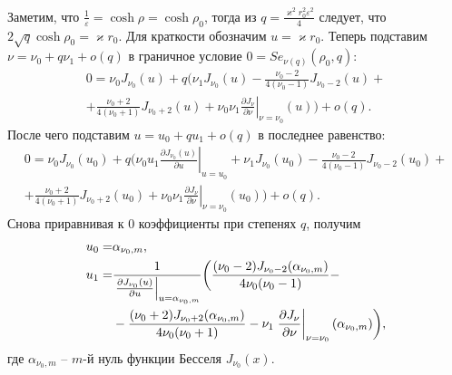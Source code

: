 Заметим, что $\frac{1}{\varepsilon} = \cosh \rho = \cosh \rho_0 $, тогда из  $q = \frac{\varkappa^2 r_0^2 \varepsilon^2}{4}$ следует, что $2\sqrt{q} \cosh{\rho_0} =   \varkappa r_0$. 
Для краткости обозначим $u = \varkappa r_0$. Теперь подставим  
$\nu=\nu_0 + q\nu_1 + o(q)$ в граничное условие $0 = Se_{\nu(q)}(\rho_0, q)$:
\begin{multline*}
0 = \nu_0 J_{\nu_0}(u) + q \bigg(  \nu_1 J_{\nu_0}(u) 
- \frac{\nu_0 - 2}{4(\nu_0-1)} J_{\nu_0-2}(u) + %
\\ %
+ \frac{\nu_0 + 2}{4(\nu_0+1)} J_{\nu_0+2}(u) +
 \nu_0 \nu_1 \left.\frac{\partial J_\nu}{\partial \nu}\right|_{\nu = \nu_0}(u)
\bigg) + o(q).
\end{multline*}
После чего подставим   $u = u_0 + q u_1 + o(q)$ в последнее равенство:
\begin{multline*}
0 = \nu_0 J_{\nu_0}(u_0) + q \bigg( 
\nu_0 u_1 \left.\frac{\partial J_{\nu_0}(u)}{\partial u}\right|_{u=u_0} 
+\nu_1 J_{\nu_0}(u_0) - \frac{\nu_0 - 2}{4(\nu_0-1)} J_{\nu_0-2}(u_0) +\\ 
+\frac{\nu_0 + 2}{4(\nu_0+1)} J_{\nu_0+2}(u_0) 
+ \nu_0 \nu_1 \left.\frac{\partial J_\nu}{\partial \nu}\right|_{\nu = \nu_0}(u_0)
\bigg) + o(q).
\end{multline*}
Снова приравнивая к $0$ коэффициенты при степенях  $q$, получим
\begin{align}
    u_0 =& \alpha_{\nu_0, m}, \label{eq:u0}\\
    u_1 =& \frac{1}{\left.\frac{\partial J_{\nu_0}(u)}{\partial u}\right|_{u=\alpha_{\nu_0, m}} } \biggl(
\frac{(\nu_0 - 2)J_{\nu_0-2}(\alpha_{\nu_0, m}) }{4 \nu_0(\nu_0-1)} - \notag \\    
&{}- \frac{(\nu_0 + 2)J_{\nu_0+2}(\alpha_{\nu_0, m}) }{4 \nu_0(\nu_0+1)} - \nu_1 \left.\frac{\partial J_\nu}{\partial \nu}\right|_{\nu = \nu_0}(\alpha_{\nu_0, m})
    \biggr),\label{eq:u1}
\end{align}
где $\alpha_{\nu_0, m}$ --  $m$-й нуль функции Бесселя $J_{\nu_0}(x)$. 




